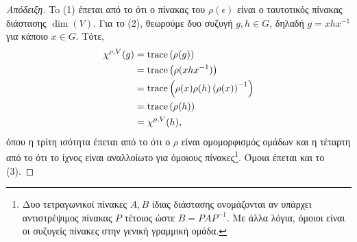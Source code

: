 \documentclass[12pt,a4paper,reqno]{amsart}
\newcommand{\defn}[1]{{\color{mylightblue}{#1}}}
\begin{document}
\begin{proof}[Απόδειξη]
    To (1) έπεται από το ότι ο πίνακας του $\rho(\epsilon)$ είναι ο ταυτοτικός πίνακας διάστασης $\dim(V)$. Για το (2), θεωρούμε δυο συζυγή $g, h \in G$, δηλαδή $g = xhx^{-1}$ για κάποιο $x \in G$. Τότε,
    \begin{align*}
    \chi^{\rho,V}(g) 
    &= \mathrm{trace}\left(\rho(g)\right) \\
    &= \mathrm{trace}\left(\rho(xhx^{-1})\right) \\
    &= \mathrm{trace}\left(\rho(x)\rho(h)\left(\rho(x)\right)^{-1}\right) \\
    &= \mathrm{trace}\left(\rho(h)\right) \\
    &= \chi^{\rho,V}(h),
    \end{align*}
    όπου η τρίτη ισότητα έπεται από το ότι ο $\rho$ είναι ομομορφισμός ομάδων και η τέταρτη από το ότι το ίχνος είναι αναλλοίωτο για όμοιους πίνακες\footnote{Δυο τετραγωνικοί πίνακες $A,B$ ίδιας διάστασης ονομάζονται \defn{όμοιοι} αν υπάρχει αντιστρέψιμος πίνακας $P$ τέτοιος ώστε $B = PAP^{-1}$. Με άλλα λόγια, όμοιοι είναι οι συζυγείς πίνακες στην γενική γραμμική ομάδα.}. Όμοια έπεται και το (3).
\end{proof}
\end{document}

